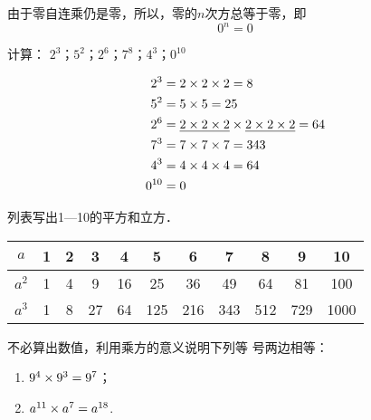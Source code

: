 由于零自连乘仍是零，所以，零的$n$次方总等于零，即
\[0^n=0 \]

\begin{example}
	计算：
	$2^3$；$5^2$；$2^6$；$7^8$；$4^3 $；$0^{10}$
\end{example}

\begin{solution}
	\[\begin{split}
	2^3&=2\times2\times2=8\\
	5^2&=5\times5=25\\
	2^6&=\underline{2\times2\times2}\times\underline{2\times2\times2}=64\\
	7^3&=7\times7\times7=343\\
	4^3&=4\times4\times4=64\\
	0^{10}&=0
	\end{split}\]
\end{solution}

\begin{example}
	列表写出1—10的平方和立方．
\end{example}

\begin{solution}
	\begin{center}
		\begin{tabular}{c|cccccccccc}
			\hline
			$a$ & 1&2&3&4&5&6&7&8&9&10\\
			\hline
			$a^2$&1&4&9&16&25&36&49&64&81&100\\
			$a^3$&1&8&27&64&125&216&343&512&729&1000\\
			\hline
		\end{tabular}
	\end{center}
\end{solution}

\begin{example}
	不必算出数值，利用乘方的意义说明下列等
	号两边相等：
	\begin{enumerate}
		\item $9^4\times9^3=9^7$；
		\item $a^{11}\times a^7=a^{18}$.
	\end{enumerate}
\end{example}

